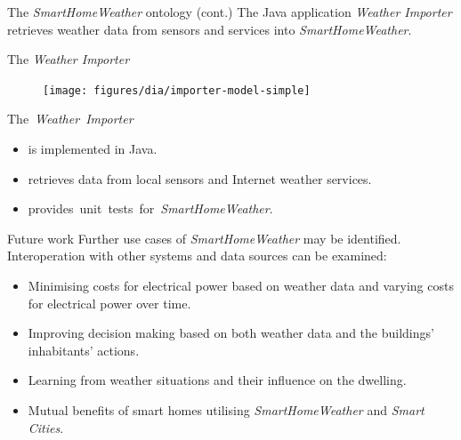 \documentclass[final,hyperref={pdfpagelabels=true}]{beamer}
\newenvironment{postit}
{\begin{beamercolorbox}[sep=1em,wd=7cm]{postit}}
{\end{beamercolorbox}}
\begin{document}
\begin{frame}[fragile]
\begin{columns}[t]
\begin{column}{.45\textwidth}
\begin{block}{The \emph{SmartHomeWeather} ontology (cont.)}
	The Java application \emph{Weather Importer} retrieves weather data from sensors and services into \emph{SmartHomeWeather}.
      \end{block}
      
      \begin{block}{The \emph{Weather Importer}}
        \begin{figure}
	  \vspace{-.5em}
	  \centering
  	  \texttt{[image: figures/dia/importer-model-simple]}
	\end{figure}

	\vspace{-1.5em}
	
	\mbox{The \emph{Weather Importer}}
	\begin{itemize}
	  \item is implemented in Java.
	  \item retrieves data from local sensors and Internet weather services.
	  \item \mbox{provides unit tests for \emph{SmartHomeWeather}.}
	\end{itemize}
      \end{block}

      \begin{block}{Future work}
	Further use cases of \emph{SmartHomeWeather} may be identified. Interoperation with other systems and data sources can be examined:
          \begin{itemize}
            \item Minimising costs for electrical power based on weather data and varying costs for electrical power over time.
	    \item Improving decision making based on both weather data and the buildings' inhabitants' actions.
	    \item Learning from weather situations and their influence on the dwelling.
	    \item Mutual benefits of smart homes utilising \emph{SmartHomeWeather} and \emph{Smart Cities}.
	  \end{itemize}
      \end{block}

%	
%	
    \end{column}
  \end{columns}

  
\end{frame}
\end{document}
